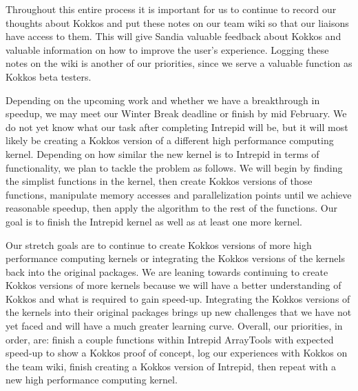 \documentclass{hmcclinic}
\begin{document}
Throughout this entire process it is important for  us to continue to record our
thoughts about Kokkos and put these notes on our team wiki so that our liaisons
have access to them.  This will give Sandia valuable feedback about Kokkos and
valuable information on how to improve the user's experience. Logging these
notes on the wiki is another of our priorities, since we serve a valuable
function as Kokkos beta testers. 

Depending on the upcoming work and whether we have a breakthrough in speedup, we
may meet our Winter Break deadline or finish by mid February. We do not yet know
what our task after completing Intrepid will be, but it will most likely be
creating a Kokkos version of a different high performance computing kernel.
Depending on how similar the new kernel is to Intrepid in terms of
functionality, we plan to tackle the problem as follows. We will begin by
finding the simplist functions in the kernel, then create Kokkos versions of
those functions, manipulate memory accesses and parallelization points until we
achieve reasonable speedup, then apply the algorithm to the rest of the
functions. Our goal is to finish the Intrepid kernel as well as at least one
more kernel. 

Our stretch goals are to continue to create Kokkos versions of more high
performance computing kernels or integrating the Kokkos versions of the kernels
back into the original packages. We are leaning towards continuing to create
Kokkos versions of more kernels because we will have a better understanding of
Kokkos and what is required to gain speed-up.  Integrating the Kokkos versions
of the kernels into their original packages brings up new challenges that we
have not yet faced and will have a much greater learning curve. Overall, our
priorities, in order, are: finish a couple functions within Intrepid ArrayTools
with expected speed-up to show a Kokkos proof of concept, log our experiences
with Kokkos on the team wiki, finish creating a Kokkos version of Intrepid, then
repeat with a new high performance computing kernel.
\end{document}
